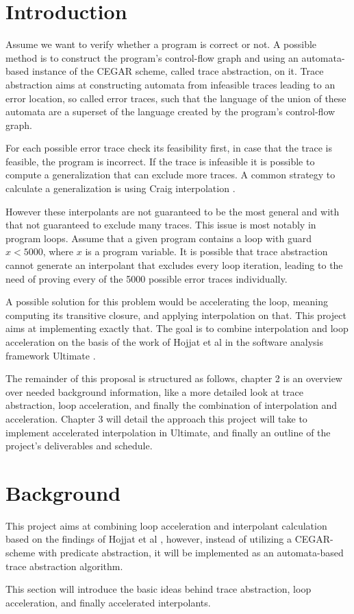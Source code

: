 \documentclass{article}
\begin{document}
\section{Introduction}
Assume we want to verify whether a program is correct or not. A possible method is to construct the program's control-flow graph and using an automata-based instance of the CEGAR scheme, called trace abstraction, on it. Trace abstraction aims at constructing automata \cite{10.1007/978-3-642-39799-8_2} from infeasible traces leading to an error location, so called error traces, such that the language of the union of these automata are a superset of the language created by the program's control-flow graph. \par 
For each possible error trace check its feasibility first, in case that the trace is feasible, the program is incorrect. If the trace is infeasible it is possible to compute a generalization that can exclude more traces. A common strategy \cite{10.1007/978-3-642-03237-0_7} to calculate a generalization is using Craig interpolation \cite{craig_1957}. \par 
However these interpolants are not guaranteed to be the most general and with that not guaranteed to exclude many traces. This issue is most notably in program loops. Assume that a given program contains a loop with guard $x < 5000$, where $x$ is a program variable. It is possible that trace abstraction cannot generate an interpolant that excludes every loop iteration, leading to the need of proving every of the 5000 possible error traces individually. \par
A possible solution for this problem would be accelerating the loop, meaning computing its transitive closure, and applying interpolation on that. This project aims at implementing exactly that. 
The goal is to combine interpolation and loop acceleration on the basis of the work of Hojjat et al \cite{10.1007/978-3-642-33386-6_16} in the software analysis framework Ultimate \cite{Zitat02}. \par
The remainder of this proposal is structured as follows, chapter 2 is an overview over needed background information, like a more detailed look at trace abstraction, loop acceleration, and finally the combination of interpolation and acceleration. Chapter 3 will detail the approach this project will take to implement accelerated interpolation in Ultimate, and finally an outline of the project's deliverables and schedule.

\section{Background}
This project aims at combining loop acceleration and interpolant calculation based on the findings of Hojjat et al \cite{10.1007/978-3-642-33386-6_16}, however, instead of utilizing a CEGAR-scheme with predicate abstraction, it will be implemented as an automata-based trace abstraction algorithm. \par
This section will introduce the basic ideas behind trace abstraction, loop acceleration, and finally accelerated interpolants.
\end{document}
